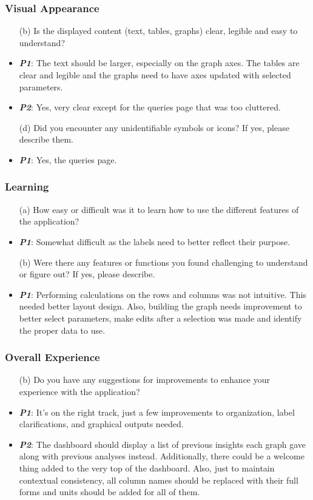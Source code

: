 \documentclass{article}
\begin{document}
\subsubsection{Visual Appearance}
\begin{itemize}
    \item[(b)] Is the displayed content (text, tables, graphs) clear, legible
    and easy to understand?
    \item \textbf{\emph{P1}}: The text should be larger, especially on the graph axes. The
    tables are clear and legible and the graphs need to have axes updated
    with selected parameters.
    \item \textbf{\emph{P2}}: Yes, very clear except for the queries page that was too
    cluttered.
    \item[(d)] Did you encounter any unidentifiable symbols or icons? If yes,
    please describe them.
    \item \textbf{\emph{P1}}: Yes, the queries page.
\end{itemize}

\subsubsection{Learning}
\begin{itemize}
    \item[(a)] How easy or difficult was it to learn how to use the different
    features of the application?
    \item \textbf{\emph{P1}}: Somewhat difficult as the labels need to better
    reflect their purpose.
    \item[(b)] Were there any features or functions you found challenging to
    understand or figure out? If yes, please describe. 
    \item \textbf{\emph{P1}}: Performing calculations on the rows and columns
    was not intuitive. This needed  better layout design. Also, building the
    graph needs improvement to better select parameters, make edits after a
    selection was made and identify the proper data to use.
\end{itemize}

\subsubsection{Overall Experience}
\begin{itemize}
    \item[(b)] Do you have any suggestions for improvements to enhance your
    experience with the application?
    \item \textbf{\emph{P1}}: It’s on the right track, just a few improvements
    to organization, label clarifications, and graphical outputs needed.
    \item \textbf{\emph{P2}}: The dashboard should display a list of previous
    insights each graph gave along with previous analyses instead. Additionally,
    there could be a welcome thing added to the very top of the dashboard. Also,
    just to maintain contextual consistency, all column names should be replaced
    with their full forms and units should be added for all of them.
\end{itemize}
\end{document}
